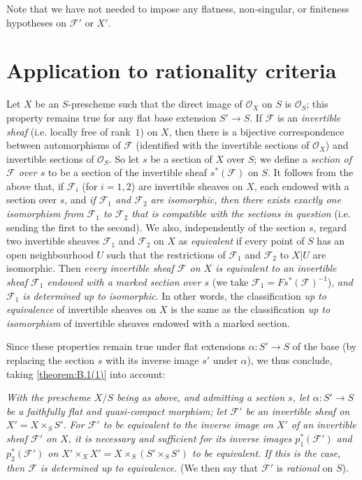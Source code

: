 \documentclass{article}
\theoremstyle{plain}
\theoremstyle{definition}
\newcommand{\sh}[1]{{\mathscr{#1}}}
\begin{document}
Note that we have not needed to impose any flatness, non-singular, or finiteness hypotheses on $\sh{F}'$ or $X'$.


\section{Application to rationality criteria}
\label{B.4}

Let $X$ be an $S$-prescheme such that the direct image of $\sh{O}_X$ on $S$ is $\sh{O}_S$;
this property remains true for any flat base extension $S'\to S$.
If $\sh{F}$ is an \emph{invertible sheaf} (i.e. locally free of rank~$1$) on $X$, then there is a bijective correspondence between automorphisms of $\sh{F}$ (identified with the invertible sections of $\sh{O}_X$) and invertible sections of $\sh{O}_S$.
So let $s$ be a section of $X$ over $S$;
we define a \emph{section of $\sh{F}$ over $s$} to be a section of the invertible sheaf $s^*(\sh{F})$ on $S$.
It follows from the above that, if $\sh{F}_i$ (for $i=1,2$) are invertible sheaves on $X$, each endowed with a section over $s$, and \emph{if $\sh{F}_1$ and $\sh{F}_2$ are isomorphic, then there exists exactly one isomorphism from $\sh{F}_1$ to $\sh{F}_2$ that is compatible with the sections in question} (i.e. sending the first to the second).
We also, independently of the section $s$, regard two invertible sheaves $\sh{F}_1$ and $\sh{F}_2$ on $X$ as \emph{equivalent} if every point of $S$ has an open neighbourhood $U$ such that the restrictions of $\sh{F}_1$ and $\sh{F}_2$ to $X|U$ are isomorphic.
Then \emph{every invertible sheaf $\sh{F}$ on $X$ is equivalent to an invertible sheaf $\sh{F}_1$ endowed with a marked section over $s$} (we take $\sh{F}_1=Fs^*(\sh{F})^{-1}$), \emph{and $\sh{F}_1$ is determined up to isomorphic}.
In other words, the classification \emph{up to equivalence} of invertible sheaves on $X$ is the same as the classification \emph{up to isomorphism} of invertible sheaves endowed with a marked section.

Since these properties remain true under flat extensions $\alpha\colon S'\to S$ of the base (by replacing the section $s$ with its inverse image $s'$ under $\alpha$), we thus conclude, taking \cref{theorem:B.1(1)} into account:

\emph{With the prescheme $X/S$ being as above, and admitting a section $s$, let $\alpha\colon S'\to S$ be a faithfully flat and quasi-compact morphism; let $\sh{F}'$ be an invertible sheaf on $X'=X\times_S S'$.}
\emph{For $\sh{F}'$ to be equivalent to the inverse image on $X'$ of an invertible sheaf $\sh{F}'$ on $X$, it is necessary and sufficient for its inverse images $p_1^*(\sh{F}')$ and $p_2^*(\sh{F}')$ on $X'\times_X X'=X\times_S(S'\times_S S')$ to be equivalent.}
\emph{If this is the case, then $\sh{F}$ is determined up to equivalence.}
(We then say that $\sh{F}'$ is \emph{rational} on $S$).
\end{document}
